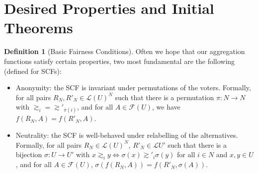 \documentclass{book}
\theoremstyle{plain}
\theoremstyle{definition}
\newtheorem{definition}[theorem]{Definition}
\theoremstyle{remark}
\begin{document}
\section{Desired Properties and Initial Theorems}
\begin{definition}[Basic Fairness Conditions]
    Often we hope that our aggregation functions satisfy certain properties,
    two most fundamental are the following (defined for SCFs):
    \begin{itemize}
        \item Anonymity: the SCF is invariant under permutations of the voters.
        Formally, for all pairs $R_N, R'_N \in \mathcal{L}(U)^N$ such that there is a permutation $\pi : N \to N$ with $\gtrsim_i = \gtrsim'_{\pi(i)}$, 
        and for all $A \in \mathcal{F}(U)$, we have $f(R_N, A) = f(R'_N, A)$.
        \item Neutrality: the SCF is well-behaved under relabelling of the alternatives.
        Formally, for all pairs $R_N \in \mathcal{L}(U)^N$, $R'_N \in \mathcal{L}{U'}$ such that there is a bijection
        $\sigma : U \to U'$ with $x \gtrsim_i y \iff \sigma(x) \gtrsim'_i \sigma(y)$ for all $i \in N$ and $x, y \in U$,
        and for all $A \in \mathcal{F}(U)$, $\sigma(f(R_N, A)) = f(R'_N, \sigma(A))$.
    \end{itemize}
\end{definition}
\end{document}
